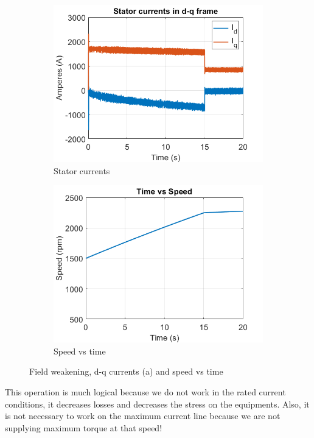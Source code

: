 \begin{figure}[H]
        \centering
        \begin{subfigure}[b]{0.475\textwidth}
            \centering
            \includegraphics[width = 8 cm]{figs/b4_new_dq.png}
            \caption{Stator currents}
            \label{fig:b4_dq}
        \end{subfigure}
        \hfill
        \begin{subfigure}[b]{0.475\textwidth}  
            \centering 
            \includegraphics[width = 8 cm]{figs/b4_new_speed.png}
            \caption{Speed vs time}
            \label{fig:b4_speed}
        \end{subfigure}
        \caption{Field weakening, d-q currents (a) and speed vs time}
        \label{fig:b4}
        \end{figure}  
        
This operation is much logical because we do not work in the rated current conditions, it decreases losses and decreases the stress on the equipments. Also, it is not necessary to work on the maximum current line because we are not supplying maximum torque at that speed!